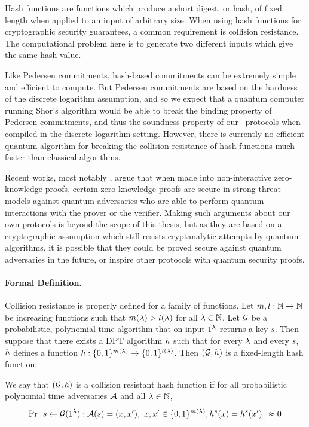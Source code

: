 Hash functions are functions which produce a short digest, or hash, of fixed length when applied to an input of arbitrary size. When using hash functions for cryptographic security guarantees, a common requirement is collision resistance. The computational problem here is to generate two different inputs which give the same hash value.

Like Pedersen commitments, hash-based commitments can be extremely simple and efficient to compute. But Pedersen commitments are based on the hardness of the discrete logarithm assumption, and so we expect that a quantum computer running Shor's algorithm would be able to break the binding property of Pedersen commitments, and thus the soundness property of our \ILC\ protocols when compiled in the discrete logarithm setting. However, there is currently no efficient quantum algorithm for breaking the collision-resistance of hash-functions much faster than classical algorithms.

Recent works, most notably \cite{Unruh17}, argue that when made into non-interactive zero-knowledge proofs, certain zero-knowledge proofs are secure in strong threat models against quantum adversaries who are able to perform quantum interactions with the prover or the verifier. Making such arguments about our own protocols is beyond the scope of this thesis, but as they are based on a cryptographic assumption which still resists cryptanalytic attempts by quantum algorithms, it is possible that they could be proved secure against quantum adversaries in the future, or inspire other protocols with quantum security proofs.

\paragraph{Formal Definition.} Collision resistance is properly defined for a family of functions. Let $m, l : \mathbb{N} \to \mathbb{N}$ be increasing functions such that $m (\lambda) > l(\lambda)$ for all $\lambda \in \mathbb{N}$. Let $\mathcal{G}$ be a probabilistic, polynomial time algorithm that on input $1^{\lambda}$ returns a key $s$. Then suppose that there exists a DPT algorithm $h$ such that for every $\lambda$ and every $s$, $h$ defines a function $h : \{0,1\}^{m(\lambda)} \to \{0,1\}^{l(\lambda)}$. Then $(\mathcal{G},h)$ is a fixed-length hash function.

We say that $(\mathcal{G},h)$ is a collision resistant hash function if for all probabilistic polynomial time adversaries $\mathcal{A}$ and all $\lambda \in \mathbb{N}$,
$$ \Pr \left[ s \gets \mathcal{G}(1^{\lambda}) : \mathcal{A}(s) = (x,x'), \ x,x'\in \{0,1\}^{m(\lambda)}, h^s(x) = h^s(x') \right] \approx 0 $$

